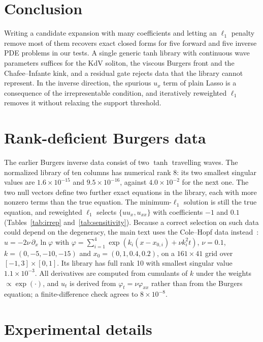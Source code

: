 \documentclass{article}
\begin{document}
\section{Conclusion}
\label{sec:conclusion}

Writing a candidate expansion with many coefficients and letting an $\ell_1$ penalty remove most of them recovers exact closed forms for five forward and five inverse PDE problems in our tests. A single generic tanh library with continuous wave parameters suffices for the KdV soliton, the viscous Burgers front and the Chafee--Infante kink, and a residual gate rejects data that the library cannot represent. In the inverse direction, the spurious $u_x$ term of plain Lasso is a consequence of the irrepresentable condition, and iteratively reweighted $\ell_1$ removes it without relaxing the support threshold.




\appendix

\section{Rank-deficient Burgers data}
\label{app:rank}
The earlier Burgers inverse data consist of two $\tanh$ travelling waves. The normalized library of ten columns has numerical rank 8: its two smallest singular values are $1.6\times10^{-15}$ and $9.5\times10^{-16}$, against $4.0\times10^{-2}$ for the next one. The two null vectors define two further exact equations in the library, each with more nonzero terms than the true equation. The minimum-$\ell_1$ solution is still the true equation, and reweighted $\ell_1$ selects $\{uu_x, u_{xx}\}$ with coefficients $-1$ and $0.1$ (Tables~\ref{tab:irrep} and~\ref{tab:sensitivity}). Because a correct selection on such data could depend on the degeneracy, the main text uses the Cole--Hopf data instead~\citep{hopf1950,cole1951}: $u = -2\nu\,\partial_x \ln\varphi$ with $\varphi = \sum_{i=1}^{4}\exp(k_i(x - x_{0,i}) + \nu k_i^2 t)$, $\nu = 0.1$, $k = (0,-5,-10,-15)$ and $x_0 = (0, 1, 0.4, 0.2)$, on a $161\times 41$ grid over $[-1,3]\times[0,1]$. Its library has full rank 10 with smallest singular value $1.1\times10^{-3}$. All derivatives are computed from cumulants of $k$ under the weights $\propto \exp(\cdot)$, and $u_t$ is derived from $\varphi_t = \nu\varphi_{xx}$ rather than from the Burgers equation; a finite-difference check agrees to $8\times10^{-8}$.

\section{Experimental details}
\label{app:details}
\end{document}
